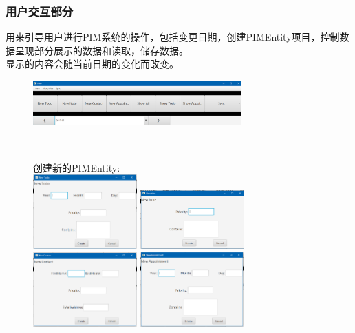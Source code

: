 \documentclass[a4paper]{article}
\begin{document}
    \subsubsection{用户交互部分}
        用来引导用户进行PIM系统的操作，包括变更日期，创建PIMEntity项目，控制数据呈现部分展示的数据和读取，储存数据。\\
        显示的内容会随当前日期的变化而改变。\\
        \begin{figure}[h]
            \centering
            \includegraphics[width=8cm]{SYNC3.png}\\
        \end{figure}\\
        \begin{figure}[h]
            创建新的PIMEntity:\\
            \centering
            \includegraphics[width=4cm]{n1.png}
            \includegraphics[width=4cm]{n2.png}\\
            \includegraphics[width=4cm]{n3.png}
            \includegraphics[width=4cm]{n4.png}\\
        \end{figure}\\
\end{document}
